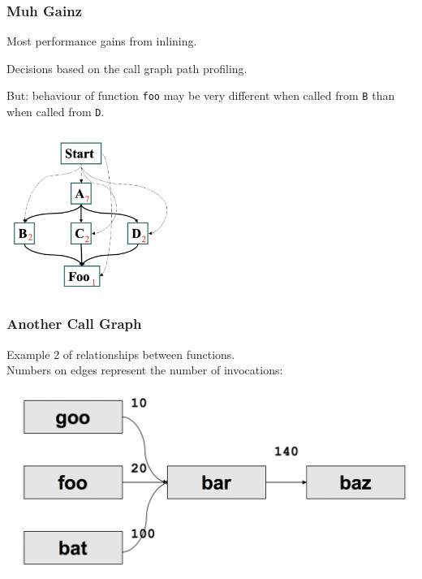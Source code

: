 \begin{frame}
\frametitle{Muh Gainz}

\large
\begin{changemargin}{2cm}
Most performance gains from inlining.

Decisions based on the call graph path profiling. 

But: behaviour of function \texttt{foo} may be very different when called from \texttt{B} than when called from \texttt{D}. 


\begin{center}
	\includegraphics[width=0.4\textwidth]{images/callpaths.png}
\end{center}
\end{changemargin}
\end{frame}



\begin{frame}
\frametitle{Another Call Graph}

\large
Example 2 of relationships between functions.\\
Numbers on edges represent the number of invocations:

\begin{center}
	\includegraphics[width=\textwidth]{images/callpaths2.png}
\end{center}

\end{frame}



